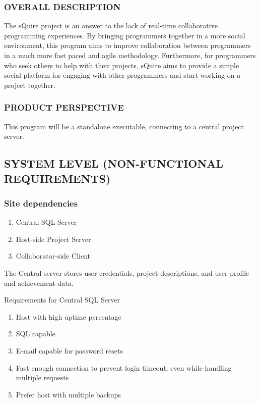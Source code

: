 \documentclass[twoside,letterpaper]{article}
\begin{document}
	\clearpage
	
	\subsubsection[OVERALL DESCRIPTION]{\rmfamily\bfseries OVERALL DESCRIPTION}
	\hypertarget{RefHeading17059017292}{}{
	{The sQuire project is an answer to the lack of real-time collaborative programming experiences. By bringing programmers together in a more social environment, this program aims to improve collaboration between programmers in a much more fast paced and agile methodology. Furthermore, for programmers who seek others to help with their projects, sQuire aims to provide a simple social platform for engaging with other programmers and start working on a project together.}}
	
	\subsubsection[PRODUCT PERSPECTIVE]{\rmfamily\bfseries PRODUCT PERSPECTIVE}
	\hypertarget{RefHeading17259017292}{}{
	\foreignlanguage{english}{This program will be a standalone executable, connecting to a central project server.}}
	
	{\color{black}
	}
	
	\clearpage

\subsection[SYSTEM LEVEL (NON-FUNCTIONAL REQUIREMENTS)]{\rmfamily\bfseries SYSTEM LEVEL (NON-FUNCTIONAL REQUIREMENTS)}


	\subsubsection[Site dependencies]{\rmfamily\bfseries Site dependencies}
		\hypertarget{RefHeading18459017292}{}
		
		\begin{enumerate}
		  \item Central SQL Server
		  \item Host-side Project Server
		  \item Collaborator-side Client
		\end{enumerate}
		
		The Central server stores user credentials, project descriptions, and user profile and achievement data.
		
		Requirements for Central SQL Server
		\begin{enumerate}
		  \item Host with high uptime percentage
		  \item SQL capable
		  \item E-mail capable for password resets
		  \item Fast enough connection to prevent login timeout, even while handling multiple requests
		  \item Prefer host with multiple backups
		\end{enumerate}
		
\end{document}
